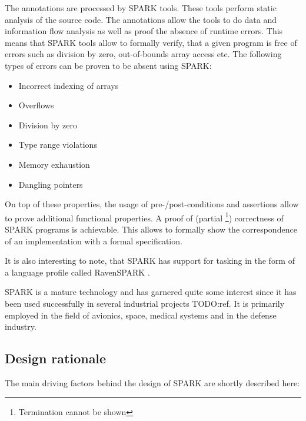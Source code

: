 The annotations are processed by SPARK tools. These tools perform static
analysis of the source code. The annotations allow the tools to do data and
information flow analysis as well as proof the absence of runtime errors. This
means that SPARK tools allow to formally verify, that a given program is free
of errors such as division by zero, out-of-bounds array access etc. The
following types of errors can be proven to be absent using SPARK:

\begin{itemize}
	\item Incorrect indexing of arrays
	\item Overflows
	\item Division by zero
	\item Type range violations
	\item Memory exhaustion
	\item Dangling pointers
\end{itemize}

On top of these properties, the usage of pre-/post-conditions and assertions
allow to prove additional functional properties. A proof of (partial
\footnote{Termination cannot be shown}) correctness of SPARK programs is
achievable. This allows to formally show the correspondence of an implementation
with a formal specification.

It is also interesting to note, that SPARK has support for tasking in the form
of a language profile called RavenSPARK \cite{RavenSPARK}.

SPARK is a mature technology and has garnered quite some interest since it has
been used successfully in several industrial projects TODO:ref. It is primarily
employed in the field of avionics, space, medical systems and in the defense
industry.

\subsection{Design rationale}
The main driving factors behind the design of SPARK are shortly described here:

